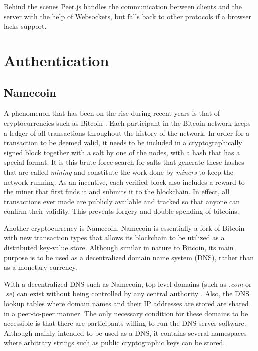 Behind the scenes Peer.js handles the communication between clients and the server with the help of Websockets, but falls back to other protocols if a browser lacks support.


\section{Authentication}


\subsection{Namecoin}
A phenomenon that has been on the rise during recent years is that of cryptocurrencies such as Bitcoin \cite{CryptoCoinInsider:2014:Online}. Each participant in the Bitcoin network keeps a ledger of all transactions throughout the history of the network. In order for a transaction to be deemed valid, it needs to be included in a cryptographically signed block together with a salt by one of the nodes, with a hash that has a special format. It is this brute-force search for salts that generate these hashes that are called \emph{mining} and constitute the work done by \emph{miners} to keep the network running. As an incentive, each verified block also includes a reward to the miner that first finds it and submits it to the blockchain\cite{InternetForBeginners:2014:Online}. In effect, all transactions ever made are publicly available and tracked so that anyone can confirm their validity. This prevents forgery and double-spending of bitcoins.

Another cryptocurrency is Namecoin\cite{CryptoCoinInsider:2014:Online}. Namecoin is essentially a fork of Bitcoin with new transaction types that allows its blockchain to be utilized as a distributed key-value store. Although similar in nature to Bitcoin, its main purpose is to be used as a decentralized domain name system (DNS), rather than as a monetary currency.

With a decentralized DNS such as Namecoin, top level domains (such as \emph{.com} or \emph{.se}) can exist without being controlled by any central authority \cite{CryptoCoinInsider:2014:Online}. Also, the DNS lookup tables where domain names and their IP addresses are stored are shared in a peer-to-peer manner. The only necessary condition for these domains to be accessible is that there are participants willing to run the DNS server software. Although mainly intended to be used as a DNS, it contains several namespaces where arbitrary strings such as public cryptographic keys can be stored.

